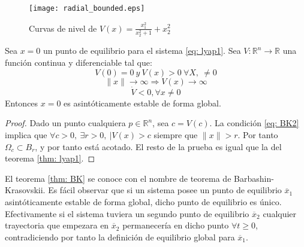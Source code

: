 \begin{figure}
 \centering
 \texttt{[image: radial\_bounded.eps]}
\caption{Curvas de nivel de $V(x) = \frac{x_1^2}{x_2^2+1}+x_2^2$}
\label{fig: radunb}
\end{figure}


\begin{theorem}\label{thm: BK}
Sea $x=0$ un punto de equilibrio para el sistema \ref{eq: lyap1}. Sea $V: \mathbb{R}^n \to \mathbb{R}$ una función continua y diferenciable tal que:
\begin{equation}
V(0) = 0\ y\ V(x) > 0\ \forall X,\  \neq 0 
\end{equation}
\begin{equation} \label{eq: BK2}
\|x\| \to \infty \Rightarrow V(x) \to \infty
\end{equation}
\begin{equation}
\dot V < 0, \forall x \neq 0
\end{equation}
Entonces $x=0$ es asintóticamente estable de forma global. 
\end{theorem} 
\begin{proof}
Dado un punto cualquiera $p \in \mathbb{R}^n$, sea $c = V(c)$. La condición \ref{eq: BK2} implica que $\forall c>0,\ \exists r>0,\ \vert V(x) > c$ siempre que $\|x\| >r$. Por tanto $\Omega_c \subset B_r$, y por tanto está acotado. El resto de la prueba es igual que la del teorema \ref{thm: lyap1}.
\end{proof}

El teorema \ref{thm: BK} se conoce con el nombre de teorema de Barbashin-Krasovskii. Es fácil observar que si un sistema posee un punto de equilibrio $\overline x_1 $ asintóticamente estable de forma global, dicho punto de equilibrio es único. Efectivamente si el sistema tuviera un segundo punto de equilibrio $\overline x_2$ cualquier trayectoria que empezara en $\overline x_2$ permanecería en dicho punto $\forall t\geq 0$, contradiciendo por tanto la definición de equilibrio global para $\overline x_1$.

